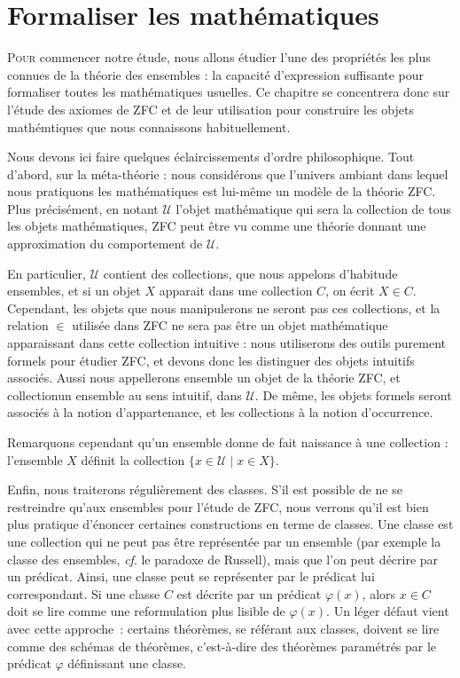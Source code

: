 \chapter{Formaliser les mathématiques}
\label{chp.axiomes}

\minitoc

\lettrine{P}{our} commencer notre étude, nous allons étudier l'une des
propriétés les plus connues de la théorie des ensembles : la capacité
d'expression suffisante pour formaliser toutes les mathématiques usuelles. Ce
chapitre se concentrera donc sur l'étude des axiomes de ZFC et de leur
utilisation pour construire les objets mathémtiques que nous connaissons
habituellement.

Nous devons ici faire quelques éclaircissements d'ordre philosophique. Tout
d'abord, sur la méta-théorie : nous considérons que l'univers ambiant dans
lequel nous pratiquons les mathématiques est lui-même un modèle de la théorie
ZFC. Plus précisément, en notant $\mathcal U$ l'objet mathématique qui sera la
collection de tous les objets mathématiques, ZFC peut être vu comme une théorie
donnant une approximation du comportement de $\mathcal U$.

En particulier, $\mathcal U$ contient des collections, que nous appelons
d'habitude ensembles, et si un objet $X$ apparait dans une collection $C$, on
écrit $X\in C$. Cependant, les objets que nous manipulerons ne seront pas ces
collections, et la relation $\in$ utilisée dans ZFC ne sera pas \og être un
objet mathématique apparaissant dans cette collection intuitive\fg{} : nous
utiliserons des outils purement formels pour étudier ZFC, et devons donc les
distinguer des objets intuitifs associés. Aussi nous appellerons \og ensemble\fg
un objet de la théorie ZFC, et \og collection\fg un ensemble au sens intuitif,
dans $\mathcal U$. De même, les objets formels seront associés à la notion
d'appartenance, et les collections à la notion d'occurrence.

Remarquons cependant qu'un ensemble donne de fait naissance à une
collection : l'ensemble $X$ définit la collection
$\{ x \in\mathcal U\mid x \in X \}$.

Enfin, nous traiterons régulièrement des classes. S'il est possible de ne se
restreindre qu'aux ensembles pour l'étude de ZFC, nous verrons qu'il est bien
plus pratique d'énoncer certaines constructions en terme de classes. Une classe
est une collection qui ne peut pas être représentée par un ensemble (par exemple
la classe des ensembles, \textit{cf}. le paradoxe de Russell), mais que l'on
peut décrire par un prédicat. Ainsi, une classe peut se représenter par le
prédicat lui correspondant. Si une classe $C$ est décrite par un prédicat
$\varphi(x)$, alors $x\in C$ doit se lire comme une reformulation plus lisible
de $\varphi(x)$. Un léger défaut vient avec cette approche~: certains théorèmes,
se référant aux classes, doivent se lire comme des schémas de théorèmes,
c'est-à-dire des théorèmes paramétrés par le prédicat $\varphi$ définissant une
classe.

